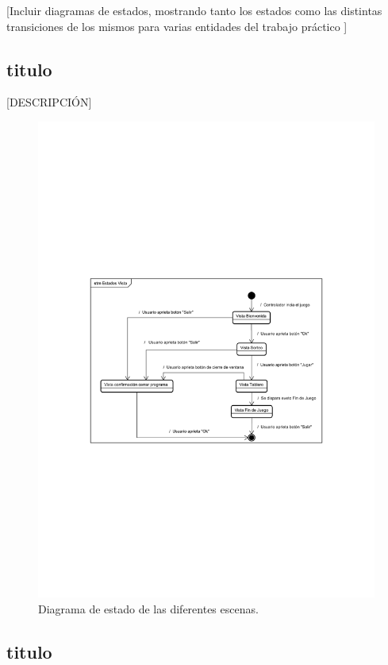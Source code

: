 [Incluir diagramas de estados, mostrando tanto los estados como las
distintas transiciones de los mismos para varias entidades del trabajo
práctico ]

\subsection{titulo}

[DESCRIPCIÓN]

\begin{figure}[H]
	\centering
	\includegraphics[scale=0.9]{includes/estado_Estados_Vista}
	\caption{Diagrama de estado de las diferentes escenas.}
	\label{estado_Estados_Vista}
\end{figure}

\subsection{titulo}

